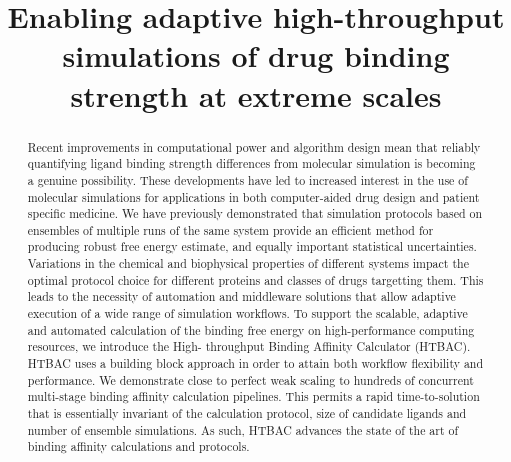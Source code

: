 \documentclass{llncs}
\title{Enabling adaptive high-throughput simulations of drug binding strength at extreme scales}
\begin{document}
\maketitle





\begin{abstract}
Recent improvements in computational power and algorithm design mean that reliably
quantifying ligand binding strength differences from molecular simulation is
becoming a genuine possibility.
These developments have led to increased interest in the use of molecular simulations
for applications in both computer-aided drug design and patient specific medicine.
We have previously demonstrated that simulation protocols based on ensembles of
multiple runs of the same system provide an efficient method for producing robust
free energy estimate, and equally important statistical uncertainties.
Variations in the chemical and biophysical properties of different systems impact the
optimal protocol choice for different proteins and classes of drugs targetting them.
This leads to the necessity of automation and middleware solutions that allow adaptive
execution of a wide range of simulation workflows.
To support the scalable, adaptive and automated calculation of the binding
free energy on high-performance computing resources, we introduce the High-
throughput Binding Affinity Calculator (HTBAC).
HTBAC uses a building block approach in order to attain both workflow flexibility
and performance.
We demonstrate close to perfect weak scaling to hundreds of concurrent multi-stage
binding affinity calculation pipelines.
This permits a rapid time-to-solution that is essentially invariant of the calculation
protocol, size of candidate ligands and number of ensemble simulations.
As such, HTBAC advances the state of the art of binding affinity calculations and
protocols.

\end{abstract}



\maketitle
\end{document}
